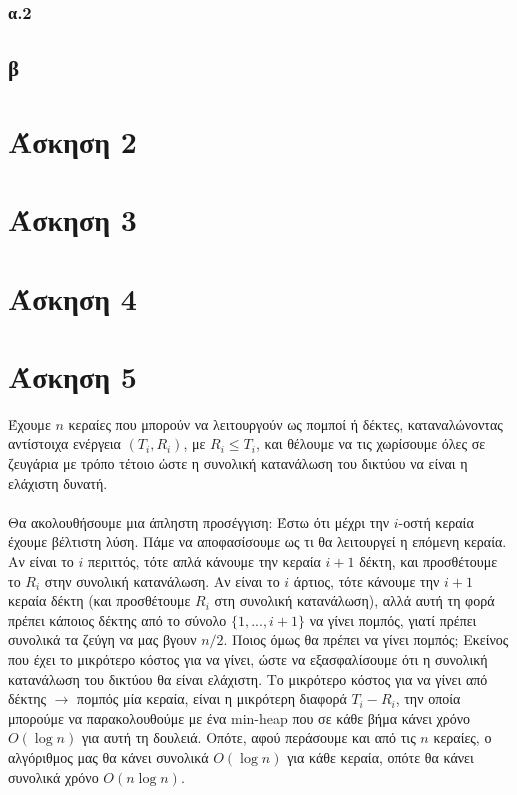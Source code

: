 \documentclass[12pt,a4paper]{article}
\begin{document}
  \subsubsection{α.2}

  

  \subsection{β}
  
  \section{Άσκηση 2}
  
  \section{Άσκηση 3}
  
  \section{Άσκηση 4}
  
  \section{Άσκηση 5}

    Έχουμε \( n \) κεραίες που μπορούν να  λειτουργούν ως πομποί ή δέκτες, καταναλώνοντας αντίστοιχα 
    ενέργεια \( (T_i, R_i) \), με \( R_i \le T_i \), και θέλουμε να τις χωρίσουμε όλες σε
    ζευγάρια με τρόπο τέτοιο ώστε η συνολική κατανάλωση του δικτύου να είναι η 
    ελάχιστη δυνατή.\\
    \\
    Θα ακολουθήσουμε μια άπληστη προσέγγιση: Έστω ότι μέχρι 
    την \( i \)-οστή κεραία έχουμε βέλτιστη λύση. Πάμε να αποφασίσουμε ως τι θα 
    λειτουργεί η επόμενη κεραία. Αν είναι το \( i \) περιττός, τότε απλά κάνουμε 
    την κεραία \( i + 1 \) δέκτη, και προσθέτουμε το \( R_i \) στην συνολική κατανάλωση. 
    Αν είναι το \( i \) άρτιος, τότε κάνουμε την \( i + 1 \) κεραία δέκτη (και 
    προσθέτουμε \( R_i \) στη συνολική κατανάλωση), αλλά αυτή τη φορά πρέπει 
    κάποιος δέκτης από το σύνολο $\{1,...,i+1\}$ να γίνει πομπός, γιατί πρέπει 
    συνολικά τα ζεύγη να μας βγουν $n/2$. Ποιος όμως θα πρέπει να γίνει πομπός;
    Εκείνος που έχει το μικρότερο κόστος για να γίνει, ώστε να εξασφαλίσουμε ότι
    η συνολική κατανάλωση του δικτύου θα είναι ελάχιστη. Το μικρότερο κόστος για
    να γίνει από δέκτης \( \rightarrow \) πομπός μία κεραία, είναι η μικρότερη διαφορά
    $T_i - R_i$, την οποία μπορούμε να παρακολουθούμε με ένα {\latintext min-heap} που σε 
    κάθε βήμα κάνει χρόνο \( O(\log{n}) \) για αυτή τη δουλειά. Οπότε, αφού περάσουμε 
    και από τις $n$ κεραίες, ο αλγόριθμος μας θα κάνει συνολικά \( O(\log{n}) \) για 
    κάθε κεραία, οπότε θα κάνει συνολικά χρόνο \( O(n\log{n}) \).
\end{document}
